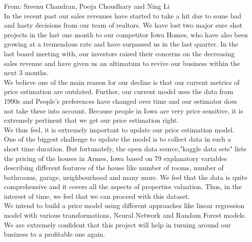 \documentclass[11pt]{article}
\begin{document}
\begin{flushleft}
From: Sreenu Chandran, Pooja Choudhary and Ning Li\\[20pt]


In the recent past our sales revenues have started to take a hit due to some bad and hasty decisions from our team of realtors. We have lost two major sure shot projects in the last one month to  our competitor Iowa Homes, who have also been growing at a tremendous rate and have surpassed us in the last quarter. In the last board meeting with, our investors raised their concerns on the decreasing sales revenue and have given us an ultimatum to revive our business within the next 3 months.\\[10pt]

We believe one of the main reason for our decline is that our current metrics of price estimation are outdated. Further, our current model uses the data from 1990s and People's preferences have changed over time and our estimator does not take these into account. Because people in Iowa are very price sensitive, it is extremely pertinent that we get our price estimation right.\\[10pt]

We thus feel, it is extremely important to update our price estimation model. One of the biggest challenge to update the model is to collect data in such a short time duration. But fortunately, the open data source,"kaggle data sets" lists the pricing of the houses in Armes, Iowa based on 79 explanatory variables describing different features of the house like number of rooms, number of bathrooms, garage, neighbourhood and many more. We feel that the data is quite comprehensive and it covers all the aspects of properties valuation. Thus, in the interest of time, we feel that we can proceed with this dataset.\\[10pt]

We intend to build a price model using different approaches like linear regression model with various transformations, Neural Network and Random Forest models.\\[10pt] 

We are extremely confident that this project will help in turning around our business to a profitable one again.\\[10pt]

\end{flushleft}
\end{document}
